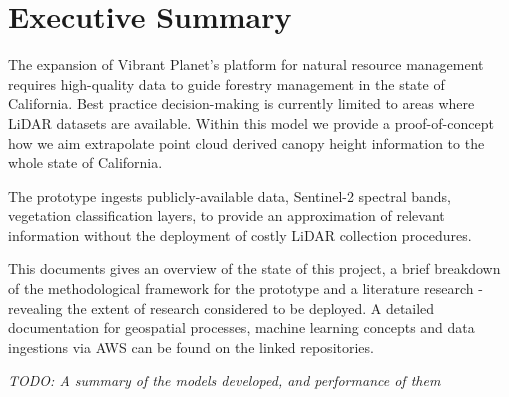 \section*{Executive Summary}

The expansion of Vibrant Planet's platform for natural resource management requires high-quality data to guide forestry management in the state of California. Best practice decision-making is currently limited to areas where LiDAR datasets are available. Within this model we provide a proof-of-concept how we aim extrapolate point cloud derived canopy height information to the whole state of California.

The prototype ingests publicly-available data, Sentinel-2 spectral bands, vegetation classification layers, to provide an approximation of relevant information without the deployment of costly LiDAR collection procedures.

This documents gives an overview of the state of this project, a brief breakdown of the methodological framework for the prototype and a literature research - revealing the extent of research considered to be deployed. A detailed documentation for geospatial processes, machine learning concepts and data ingestions via AWS can be found on the linked repositories.

\emph{TODO: A summary of the models developed, and performance of them}

